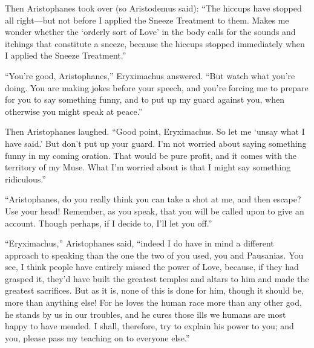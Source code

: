 \blank[line]

Then Aristophanes took over (so Aristodemus said): “The hiccups have
stopped all right---but not before I applied the Sneeze Treatment to
them. Makes me wonder whether the ‘orderly sort of Love’ in the body
calls for the sounds and itchings that constitute a sneeze, because the
hiccups stopped immediately when I applied the Sneeze Treatment.”

“You’re good, Aristophanes,” Eryximachus answered. “But watch what
you’re doing. You are making jokes before your speech, and you’re
forcing me to prepare for you to say something funny, and to put up my
guard  against you, when otherwise you might speak at peace.”

Then Aristophanes laughed. “Good point, Eryximachus. So let me ‘unsay
what I have said.’ But don’t put up your guard. I’m not worried about
saying something funny in my coming oration. That would be pure profit,
and it comes with the territory of my Muse. What I’m worried about is
that I might say something ridiculous.”

“Aristophanes, do you really think you can take a shot at me, and then
escape? Use your head! Remember, as you speak, that you will be called
 upon to give an account. Though perhaps, if I decide to, I’ll
let you off.”

“Eryximachus,” Aristophanes said, “indeed I do have in mind a different
approach to speaking than the one the two of you used, you and
Pausanias. You see, I think people have entirely missed the power of
Love, because, if they had grasped it, they’d have built the greatest
temples and altars to him and made the greatest sacrifices. But as it
is, none of this is done for him, though it should be, more than
anything else! For he loves the human  race more than any other
god, he stands by us in our troubles, and he cures those ills we humans
are most happy to have mended. I shall, therefore, try to explain his
power to you; and you, please pass my teaching on to everyone
else.”

\blank[line]

